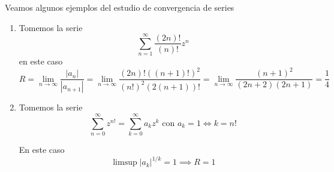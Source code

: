 \documentclass{apuntes}
\begin{document}
Veamos algunos ejemplos del estudio de convergencia de series
\begin{example}
\begin{enumerate}
\item
Tomemos la serie
\[\sum_{n=1}^{\infty} \frac{(2n)!}{(n)!}z^n\]
en este caso
\[R = \lim_{n \to \infty} \frac{|a_n|}{|a_{n+1}|} = \lim_{n \to \infty} \frac{(2n)!((n+1)!)^2}{(n!)^2(2(n+1))!} = \lim_{n \to \infty} \frac{(n+1)^2}{(2n+2)(2n+1)} = \frac{1}{4}\]

\item
Tomemos la serie
\[\sum_{n=0}^{\infty} z^{n!} = \sum_{k=0}^{\infty}a_k z^k \text{ con } a_k = 1 \iff k=n!\]

En este caso
\[\limsup|a_k|^{1/k} = 1 \implies R = 1\]

\end{enumerate}
\end{example}
\end{document}
